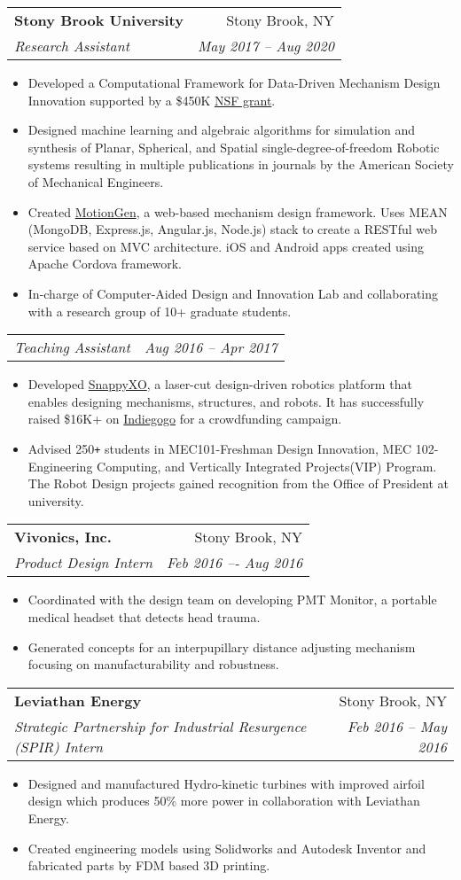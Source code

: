 \documentclass[letterpaper,10pt]{article}
\makeatletter
\newcommand{\resumeHeading}[4]{
  \vspace{-1pt}
    \begin{tabular*}{0.97\textwidth}{l@{\extracolsep{\fill}}r}
      \textbf{#1} & #2 \vspace{-2pt}\\ \vspace{1pt}
      \textit{\small#3} & \textit{\small #4} \\
    \end{tabular*}
}
\newcommand{\resumeSubheadingWithDate}[2]{
    \begin{tabular*}{0.97\textwidth}{l@{\extracolsep{\fill}}r}
      \textit{\small#1} & \textit{\small #2}\\
    \end{tabular*}
    \vspace{+2pt}
}
\newcommand{\resumeItemListStart}{
\vspace{-7pt}
\begin{itemize}[leftmargin=14pt]
}
\newcommand{\resumeItemListEnd}{
\vspace{+7pt}
\end{itemize}
}
\newcommand{\resumeItem}[1]{
  \item\small{
      {#1 \vspace{-7pt}
      }
  }
}
\makeatother
\begin{document}
\resumeHeading
{Stony Brook University}{Stony Brook, NY}
{Research Assistant}{May 2017 -- Aug 2020}
\resumeItemListStart
\resumeItem{Developed a Computational Framework for Data-Driven Mechanism Design Innovation supported by a \$450K \href{https://nsf.gov/awardsearch/showAward?AWD_ID=1563413}{NSF grant}.}
\resumeItem{Designed machine learning and algebraic algorithms for simulation and synthesis of Planar, Spherical, and Spatial single-degree-of-freedom Robotic systems resulting in multiple publications in journals by the American Society of Mechanical Engineers.}
\resumeItem{Created \href{http://cadcam.eng.sunysb.edu/}{MotionGen}, a web-based mechanism design framework. Uses MEAN (MongoDB, Express.js, Angular.js, Node.js) stack to create a RESTful web service based on MVC architecture. iOS and Android apps created using Apache Cordova framework.}
\resumeItem{In-charge of Computer-Aided Design and Innovation Lab and collaborating with a research group of 10+ graduate students.}
\resumeItemListEnd

\resumeSubheadingWithDate{Teaching Assistant}{Aug 2016 -- Apr 2017}
\resumeItemListStart
\resumeItem{Developed \href{http://snappyxo.com/}{SnappyXO}, a laser-cut design-driven robotics platform that enables designing mechanisms, structures, and robots. It has successfully raised \$16K+ on \href{https://www.indiegogo.com/projects/snappyxo-a-design-driven-robotics-education-kit}{Indiegogo} for a crowdfunding campaign.}
\resumeItem{Advised 250\texttt{+} students in MEC101-Freshman Design Innovation, MEC 102-Engineering Computing, and Vertically Integrated Projects(VIP) Program. The Robot Design projects gained recognition from the Office of President at university.}
\resumeItemListEnd

\resumeHeading
{Vivonics, Inc.}{Stony Brook, NY}
{Product Design Intern}{Feb 2016 –- Aug 2016}
\resumeItemListStart
\resumeItem{Coordinated with the design team on developing PMT Monitor, a portable medical headset that detects head trauma.}
\resumeItem{Generated concepts for an interpupillary distance adjusting mechanism focusing on manufacturability and robustness.}
\resumeItemListEnd

\resumeHeading
{Leviathan Energy}{Stony Brook, NY}
{Strategic Partnership for Industrial Resurgence (SPIR) Intern}{Feb 2016 – May 2016}
\resumeItemListStart
\resumeItem{Designed and manufactured Hydro-kinetic turbines with improved airfoil design which produces 50\% more power in collaboration with Leviathan Energy.}
\resumeItem{Created engineering models using Solidworks and Autodesk Inventor and fabricated parts by FDM based 3D printing.}
\resumeItemListEnd
\end{document}
